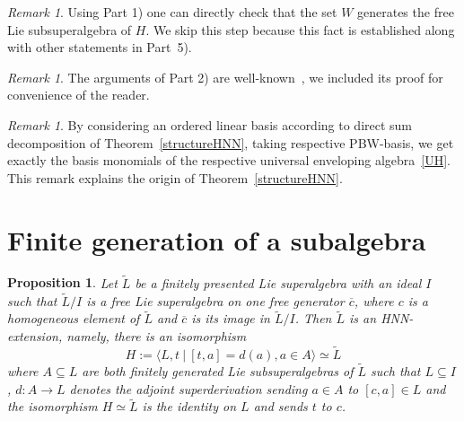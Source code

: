 \documentclass[12pt, reqno]{amsart}
\newtheorem{prop}[theorem]{Proposition}
\theoremstyle{remark}
\newtheorem{remark}[theorem]{Remark}
\theoremstyle{definition}
\numberwithin{equation}{section}
\begin{document}
\begin{remark}
Using Part 1) one can directly check that the set $W$ generates the free Lie subsuperalgebra of $H$.
We skip this step because this fact is established along with other statements in Part~5).
 \end{remark}

\begin{remark}
The arguments of Part 2) are well-known~\cite{BMPZ}, we included its proof for convenience of the reader.
\end{remark}

\begin{remark}
By considering an ordered linear basis according to direct sum decomposition of Theorem~\ref{structureHNN},
taking respective PBW-basis, we get exactly the basis monomials of the respective universal enveloping algebra~\eqref{UH}.
This remark explains the origin of Theorem~\ref{structureHNN}.
\end{remark}



\section{ Finite generation of a subalgebra}


 \begin{prop}\label{hnn}  Let $\widetilde{L}$ be a finitely presented Lie superalgebra with 
 an ideal $I$  such that $\widetilde{L}/ I$ is a free Lie superalgebra on one free generator $\overline{c}$, where $c$ is a homogeneous element of $\widetilde{L}$ and $\overline{c}$ is its image in $\widetilde{L}/ I$. 
 Then $\widetilde L$ is an HNN-extension, namely,
 there is an isomorphism
 $$  H  := \langle L, t \ | \ [t,a] = d(a), a \in A \rangle  \simeq \widetilde{L}$$
 where $A \subseteq L$ are both finitely generated Lie  subsuperalgebras of $\widetilde{L}$ such that $L \subseteq I$, $d : A \to L$  
 denotes the adjoint superderivation sending $a \in A$ to $[c,a] \in L$ and  the isomorphism $H \simeq \widetilde{L}$  is the identity on $L$ and sends $t$ to $c$.
 \end{prop}
\end{document}
